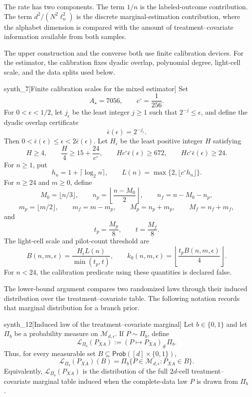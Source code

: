 \documentclass[11pt]{article}
\begin{document}
The rate  has two components. The term \(1/n\) is the labeled-outcome contribution. The term \(d^2/(N^2\ell_n^2)\) is the discrete marginal-estimation contribution, where the alphabet dimension is compared with the amount of treatment--covariate information available from both samples.

The upper construction and the converse both use finite calibration devices. For the estimator, the calibration fixes dyadic overlap, polynomial degree, light-cell scale, and the data splits used below.

\begin{definitionv}{synth_7}[Finite calibration scales for the mixed estimator]
Set
\[
A_\star=7056,\qquad c^\circ=\frac1{256}.
\]
For \(0<\epsilon<1/2\), let \(j_\epsilon\) be the least integer \(j\ge1\) such that \(2^{-j}\le\epsilon\), and define the dyadic overlap certificate
\[
\bar\epsilon(\epsilon)=2^{-j_\epsilon}.
\]
Then \(0<\bar\epsilon(\epsilon)\le\epsilon<2\bar\epsilon(\epsilon)\). Let \(H_\epsilon\) be the least positive integer \(H\) satisfying
\[
H\ge4,\qquad \frac H4\ge15+\frac{24}{c^\circ},\qquad
Hc^\circ\bar\epsilon(\epsilon)\ge672,\qquad
Hc^\circ\bar\epsilon(\epsilon)\ge24.
\]
For \(n\ge1\), put
\[
h_n=1+\lceil\log_2 n\rceil,\qquad
L(n)=\max\{2,\lfloor c^\circ h_n\rfloor\}.
\]
For \(n\ge24\) and \(m\ge0\), define
\[
M_0=\lfloor n/3\rfloor,\qquad
n_p=\left\lfloor\frac{n-M_0}{2}\right\rfloor,\qquad
n_f=n-M_0-n_p,
\]
\[
m_p=\lfloor m/2\rfloor,\qquad m_f=m-m_p,\qquad
M_p=n_p+m_p,\qquad M_f=n_f+m_f,
\]
and
\[
t_p=\frac{M_p}{8},\qquad t=\frac{M_f}{8}.
\]
The light-cell scale and pilot-count threshold are
\[
B(n,m,\epsilon)=\frac{H_\epsilon L(n)}{\min(t_p,t)},\qquad
k_0(n,m,\epsilon)=\left\lfloor\frac{t_p B(n,m,\epsilon)}4\right\rfloor .
\]
For \(n<24\), the calibration predicate using these quantities is declared false.
\end{definitionv}

The lower-bound argument compares two randomized laws through their induced distribution over the treatment--covariate table. The following notation records that marginal distribution for a branch prior.

\begin{definitionv}{synth_12}[Induced law of the treatment--covariate marginal]
Let \(b\in\{0,1\}\) and let \(\Pi_b\) be a probability measure on \(\mathcal M_{d,\epsilon}\). If \(P\sim\Pi_b\), define
\[
\mathcal L_{\Pi_b}(P_{XA})
:=
(P\mapsto P_{XA})_{\#}\Pi_b .
\]
Thus, for every measurable set \(B\subseteq\mathsf{Prob}([d]\times\{0,1\})\),
\[
\mathcal L_{\Pi_b}(P_{XA})(B)
=
\Pi_b\{P\in\mathcal M_{d,\epsilon}:P_{XA}\in B\}.
\]
Equivalently, \(\mathcal L_{\Pi_b}(P_{XA})\) is the distribution of the full \(2d\)-cell treatment--covariate marginal table induced when the complete-data law \(P\) is drawn from \(\Pi_b\).
\end{definitionv}
\end{document}
